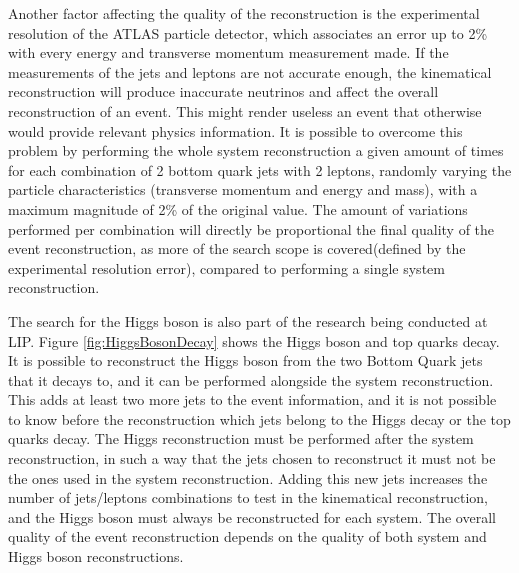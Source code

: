 Another factor affecting the quality of the reconstruction is the experimental resolution of the ATLAS particle detector, which associates an error up to 2\% with every energy and transverse momentum measurement made. If the measurements of the jets and leptons are not accurate enough, the kinematical reconstruction will produce inaccurate neutrinos and affect the overall reconstruction of an event. This might render useless an event that otherwise would provide relevant physics information. It is possible to overcome this problem by performing the whole \ttbar system reconstruction a given amount of times for each combination of 2 bottom quark jets with 2 leptons, randomly varying the particle characteristics (transverse momentum and energy and mass), with a maximum magnitude of 2\% of the original value. The amount of variations performed per combination will directly be proportional the final quality of the event reconstruction, as more of the search scope is covered(defined by the experimental resolution error), compared to performing a single \ttbar system reconstruction.

The search for the Higgs boson is also part of the research being conducted at LIP. Figure \ref{fig:HiggsBosonDecay} shows the Higgs boson and top quarks decay. It is possible to reconstruct the Higgs boson from the two Bottom Quark jets that it decays to, and it can be performed alongside the \ttbar system reconstruction. This adds at least two more jets to the event information, and it is not possible to know before the reconstruction which jets belong to the Higgs decay or the top quarks decay. The Higgs reconstruction must be performed after the \ttbar system reconstruction, in such a way that the jets chosen to reconstruct it must not be the ones used in the \ttbar system reconstruction. Adding this new jets increases the number of jets/leptons combinations to test in the kinematical reconstruction, and the Higgs boson must always be reconstructed for each \ttbar system. The overall quality of the event reconstruction depends on the quality of both \ttbar system and Higgs boson reconstructions.

